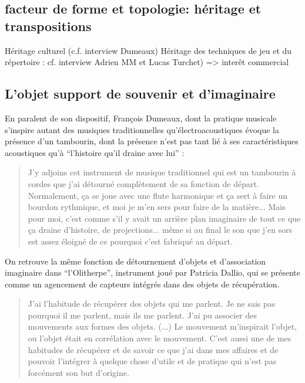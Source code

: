 
\subsection{facteur de forme et topologie: héritage et transpositions}
Héritage culturel (c.f. interview Dumeaux)
Héritage des techniques de jeu et du répertoire : cf. interview Adrien MM et Lucas Turchet) => interêt commercial  

\subsection{L'objet support de souvenir et d'imaginaire}

En paralent de son dispositif, François Dumeaux, dont la pratique musicale s'inspire autant des musiques traditionnelles qu'électroacoustiques évoque la présence d'un tambourin, dont la présence n'est pas tant lié à ses caractéristiques acoustiques qu'à ``l'histoire qu'il draine avec lui'' :
\begin{quotation}
	J'y adjoins cet instrument de musique traditionnel qui est un tambourin à cordes que j'ai détourné complètement de sa fonction de départ. Normalement, ça se joue avec une flute harmonique et ça sert à faire un bourdon rythmique, et moi je m'en sers pour faire de la matière... Mais pour moi, c'est comme s'il y avait un arrière plan imaginaire de tout ce que ça draine d'histoire, de projections... même si au final le son que j'en sors est assez éloigné de ce pourquoi c'est fabriqué au départ.
\end{quotation}

On retrouve la même fonction de détournement d'objets et d'association imaginaire dans ``l'Olitherpe'', instrument joué par Patricia Dallio, qui se présente comme un agencement de capteurs intégrés dans des objets de récupération. 

\begin{quotation}
	J'ai l'habitude de récupérer des objets qui me parlent. Je ne sais pas pourquoi il me parlent, mais ils me parlent. J'ai pu associer des mouvements aux formes des objets. (...) Le mouvement m'inspirait l'objet, ou l'objet était en corrélation avec le mouvement. C'est aussi une de mes habitudes de récupérer et de savoir ce que j'ai dans mes affaires et de pouvoir l'intégrer à quelque chose d'utile et de pratique qui n'est pas forcément son but d'origine.
\end{quotation}

